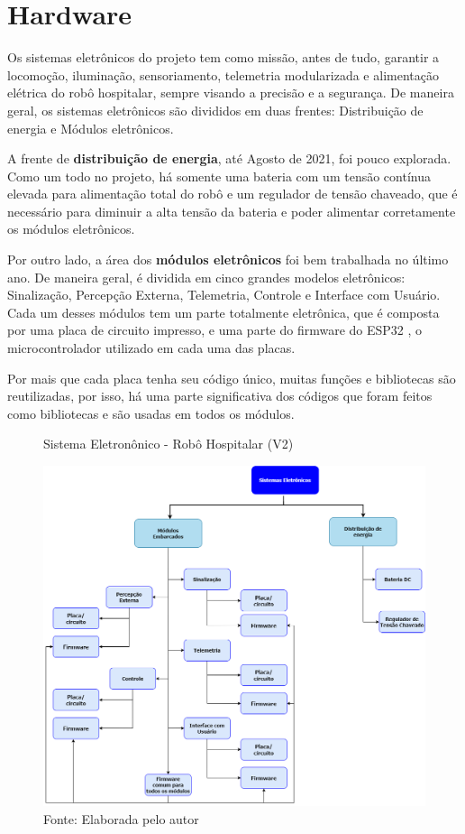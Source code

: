 \documentclass[../poliXuniversity_hospital_-USP-report.tex]{subfiles}
\begin{document}
\section{Hardware}
Os sistemas eletrônicos do projeto tem como missão, antes de tudo, garantir a locomoção, iluminação, sensoriamento, telemetria modularizada e alimentação elétrica do robô hospitalar, sempre visando a precisão e a segurança. De maneira geral, os sistemas eletrônicos são divididos em duas frentes: Distribuição de energia e Módulos eletrônicos.

A frente de \textbf{distribuição de energia}, até Agosto de 2021, foi pouco explorada. Como um todo no projeto, há somente uma bateria com um tensão contínua elevada para alimentação total do robô e um regulador de tensão chaveado, que é necessário para diminuir a alta tensão da bateria e poder alimentar corretamente os módulos eletrônicos.

Por outro lado, a área dos \textbf{módulos eletrônicos} foi bem trabalhada no último ano. De maneira geral, é dividida em cinco grandes modelos eletrônicos: Sinalização, Percepção Externa, Telemetria, Controle e Interface com Usuário. Cada um desses módulos tem um parte totalmente eletrônica, que é composta por uma placa de circuito impresso, e uma parte do firmware do ESP32 \cite{esp32_datasheet}, o microcontrolador utilizado em cada uma das placas.

Por mais que cada placa tenha seu código único, muitas funções e bibliotecas são reutilizadas, por isso, há uma parte significativa dos códigos que foram feitos como bibliotecas e são usadas em todos os módulos.


\begin{figure}[h]
\centering
    \caption{Sistema Eletronônico - Robô Hospitalar (V2)}
    \centering %
    \includegraphics[width=17cm]{sistema_eletronico.png}
    \caption*{Fonte: Elaborada pelo autor}
    \label{figura:1° Versão Robô Hospitalar}
\end{figure}
\end{document}
